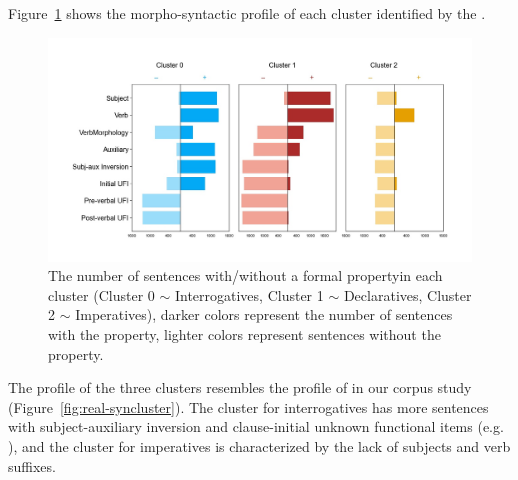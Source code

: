 Figure~\ref{fig:target-syncluster} shows the morpho-syntactic profile of each cluster identified by the \plearnerabbr{}. 

\begin{figure}[H]
    \centering
    \includegraphics[width=1\textwidth]{figures/target-syncluster.jpg}
    \caption{The number of sentences with/without a formal propertyin each cluster (Cluster 0 $\sim$ Interrogatives, Cluster 1 $\sim$ Declaratives, Cluster 2 $\sim$ Imperatives), darker colors represent the number of sentences with the property, lighter colors represent sentences without the property.}
    \label{fig:target-syncluster}
\end{figure}

The profile of the three clusters resembles the profile of \diis{} in our corpus study (Figure~\ref{fig:real-syncluster}). The cluster for interrogatives has more sentences with subject-auxiliary inversion and clause-initial unknown functional items (e.g. \twh{}), and the cluster for imperatives is characterized by the lack of subjects and verb suffixes. 

